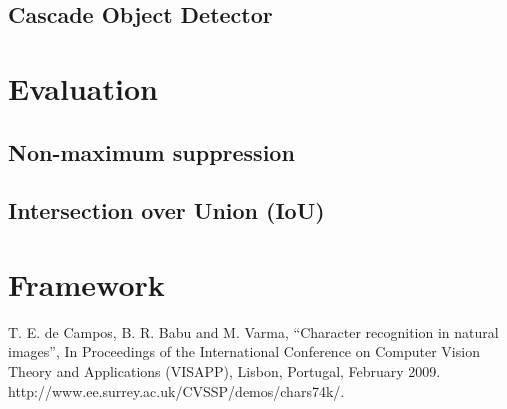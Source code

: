 \documentclass[conference]{IEEEtran}
\begin{document}
\subsection{Cascade Object Detector}

\section{Evaluation}

\subsection{Non-maximum suppression}

\subsection{Intersection over Union (IoU)}

\section{Framework}

\begin{thebibliography}{00}
 T. E. de Campos, B. R. Babu and M. Varma, ``Character recognition in natural images'', In Proceedings of the International Conference on Computer Vision Theory and Applications (VISAPP), Lisbon, Portugal, February 2009. http://www.ee.surrey.ac.uk/CVSSP/demos/chars74k/.
\end{thebibliography}
\end{document}
